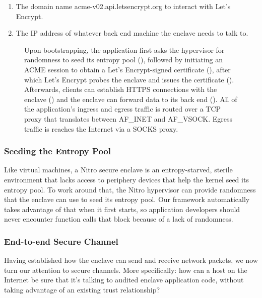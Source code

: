 \begin{enumerate}
    \item The domain name acme-v02.api.letsencrypt.org to interact with Let's
      Encrypt.
    \item The IP address of whatever back end machine the enclave needs to talk
      to.
\end{enumerate}


\newcommand{\addr}[1]{{\footnotesize \color{gray}#1 }}

\begin{figure}[t]
\centering

\caption{Upon bootstrapping, the application first asks the hypervisor for
  randomness to seed its entropy pool (), followed by initiating an
  ACME session to obtain a Let's Encrypt-signed certificate (), after
  which Let's Encrypt probes the enclave and issues the certificate
  ().  Afterwards, clients can establish HTTPS connections with the
  enclave () and the enclave can forward data to its back end
  ().  All of the application's ingress and egress  traffic is routed
  over a TCP proxy that translates between AF\_INET and AF\_VSOCK.  Egress
  traffic is reaches the Internet via a SOCKS proxy.}
\label{fig:networking}
\end{figure}

\subsubsection{Seeding the Entropy Pool}
\label{sec:entropy}

Like virtual machines, a Nitro secure enclave is an entropy-starved, sterile
environment that lacks access to periphery devices that help the kernel seed its
entropy pool.  To work around that, the Nitro hypervisor can provide randomness
that the enclave can use to seed its entropy pool.  Our framework automatically
takes advantage of that when it first starts, so application developers should
never encounter function calls that block because of a lack of randomness.

\subsubsection{End-to-end Secure Channel}
\label{sec:cert}

Having established how the enclave can send and receive network packets, we now
turn our attention to secure channels.  More specifically: how can a host on
the Internet be sure that it's talking to audited enclave application code,
without taking advantage of an existing trust relationship?

